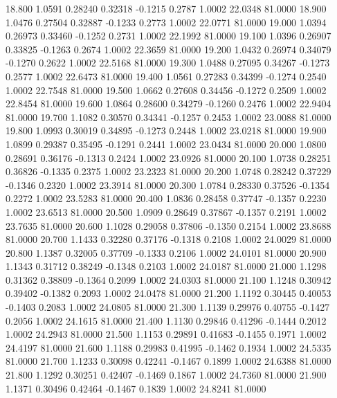   18.800   1.0591   0.28240   0.32318  -0.1215   0.2787   1.0002  22.0348  81.0000
  18.900   1.0476   0.27504   0.32887  -0.1233   0.2773   1.0002  22.0771  81.0000
  19.000   1.0394   0.26973   0.33460  -0.1252   0.2731   1.0002  22.1992  81.0000
  19.100   1.0396   0.26907   0.33825  -0.1263   0.2674   1.0002  22.3659  81.0000
  19.200   1.0432   0.26974   0.34079  -0.1270   0.2622   1.0002  22.5168  81.0000
  19.300   1.0488   0.27095   0.34267  -0.1273   0.2577   1.0002  22.6473  81.0000
  19.400   1.0561   0.27283   0.34399  -0.1274   0.2540   1.0002  22.7548  81.0000
  19.500   1.0662   0.27608   0.34456  -0.1272   0.2509   1.0002  22.8454  81.0000
  19.600   1.0864   0.28600   0.34279  -0.1260   0.2476   1.0002  22.9404  81.0000
  19.700   1.1082   0.30570   0.34341  -0.1257   0.2453   1.0002  23.0088  81.0000
  19.800   1.0993   0.30019   0.34895  -0.1273   0.2448   1.0002  23.0218  81.0000
  19.900   1.0899   0.29387   0.35495  -0.1291   0.2441   1.0002  23.0434  81.0000
  20.000   1.0800   0.28691   0.36176  -0.1313   0.2424   1.0002  23.0926  81.0000
  20.100   1.0738   0.28251   0.36826  -0.1335   0.2375   1.0002  23.2323  81.0000
  20.200   1.0748   0.28242   0.37229  -0.1346   0.2320   1.0002  23.3914  81.0000
  20.300   1.0784   0.28330   0.37526  -0.1354   0.2272   1.0002  23.5283  81.0000
  20.400   1.0836   0.28458   0.37747  -0.1357   0.2230   1.0002  23.6513  81.0000
  20.500   1.0909   0.28649   0.37867  -0.1357   0.2191   1.0002  23.7635  81.0000
  20.600   1.1028   0.29058   0.37806  -0.1350   0.2154   1.0002  23.8688  81.0000
  20.700   1.1433   0.32280   0.37176  -0.1318   0.2108   1.0002  24.0029  81.0000
  20.800   1.1387   0.32005   0.37709  -0.1333   0.2106   1.0002  24.0101  81.0000
  20.900   1.1343   0.31712   0.38249  -0.1348   0.2103   1.0002  24.0187  81.0000
  21.000   1.1298   0.31362   0.38809  -0.1364   0.2099   1.0002  24.0303  81.0000
  21.100   1.1248   0.30942   0.39402  -0.1382   0.2093   1.0002  24.0478  81.0000
  21.200   1.1192   0.30445   0.40053  -0.1403   0.2083   1.0002  24.0805  81.0000
  21.300   1.1139   0.29976   0.40755  -0.1427   0.2056   1.0002  24.1615  81.0000
  21.400   1.1130   0.29846   0.41296  -0.1444   0.2012   1.0002  24.2943  81.0000
  21.500   1.1153   0.29891   0.41683  -0.1455   0.1971   1.0002  24.4197  81.0000
  21.600   1.1188   0.29983   0.41995  -0.1462   0.1934   1.0002  24.5335  81.0000
  21.700   1.1233   0.30098   0.42241  -0.1467   0.1899   1.0002  24.6388  81.0000
  21.800   1.1292   0.30251   0.42407  -0.1469   0.1867   1.0002  24.7360  81.0000
  21.900   1.1371   0.30496   0.42464  -0.1467   0.1839   1.0002  24.8241  81.0000
